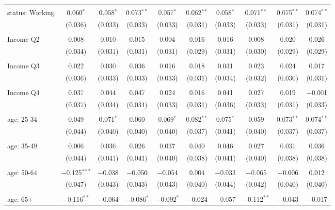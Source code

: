 \begin{tabular}{@{\extracolsep{5pt}}lccccccccc}
  & & & & & & & & & \\ 
 status: Working & 0.060$^{*}$ & 0.058$^{*}$ & 0.073$^{**}$ & 0.057$^{*}$ & 0.062$^{**}$ & 0.058$^{*}$ & 0.071$^{**}$ & 0.075$^{**}$ & 0.074$^{**}$ \\ 
  & (0.036) & (0.033) & (0.033) & (0.033) & (0.031) & (0.033) & (0.033) & (0.031) & (0.031) \\ 
  & & & & & & & & & \\ 
 Income Q2 & 0.008 & 0.010 & 0.015 & 0.004 & 0.016 & 0.016 & 0.008 & 0.020 & 0.026 \\ 
  & (0.034) & (0.031) & (0.031) & (0.031) & (0.029) & (0.031) & (0.030) & (0.029) & (0.029) \\ 
  & & & & & & & & & \\ 
 Income Q3 & 0.022 & 0.030 & 0.036 & 0.016 & 0.018 & 0.031 & 0.023 & 0.024 & 0.017 \\ 
  & (0.036) & (0.033) & (0.033) & (0.033) & (0.031) & (0.034) & (0.032) & (0.030) & (0.031) \\ 
  & & & & & & & & & \\ 
 Income Q4 & 0.037 & 0.044 & 0.047 & 0.024 & 0.016 & 0.041 & 0.027 & 0.019 & $-$0.001 \\ 
  & (0.037) & (0.034) & (0.034) & (0.033) & (0.031) & (0.036) & (0.033) & (0.031) & (0.033) \\ 
  & & & & & & & & & \\ 
 age: 25-34 & 0.049 & 0.071$^{*}$ & 0.060 & 0.069$^{*}$ & 0.082$^{**}$ & 0.075$^{*}$ & 0.059 & 0.073$^{**}$ & 0.074$^{**}$ \\ 
  & (0.044) & (0.040) & (0.040) & (0.040) & (0.037) & (0.041) & (0.040) & (0.037) & (0.037) \\ 
  & & & & & & & & & \\ 
 age: 35-49 & 0.006 & 0.036 & 0.026 & 0.037 & 0.040 & 0.046 & 0.027 & 0.031 & 0.036 \\ 
  & (0.044) & (0.041) & (0.041) & (0.040) & (0.038) & (0.041) & (0.040) & (0.038) & (0.038) \\ 
  & & & & & & & & & \\ 
 age: 50-64 & $-$0.125$^{***}$ & $-$0.038 & $-$0.050 & $-$0.054 & 0.004 & $-$0.033 & $-$0.065 & $-$0.006 & 0.012 \\ 
  & (0.047) & (0.043) & (0.043) & (0.043) & (0.040) & (0.044) & (0.042) & (0.040) & (0.040) \\ 
  & & & & & & & & & \\ 
 age: 65+ & $-$0.116$^{**}$ & $-$0.064 & $-$0.086$^{*}$ & $-$0.092$^{*}$ & $-$0.024 & $-$0.057 & $-$0.112$^{**}$ & $-$0.043 & $-$0.017 \\ 

\end{tabular}
